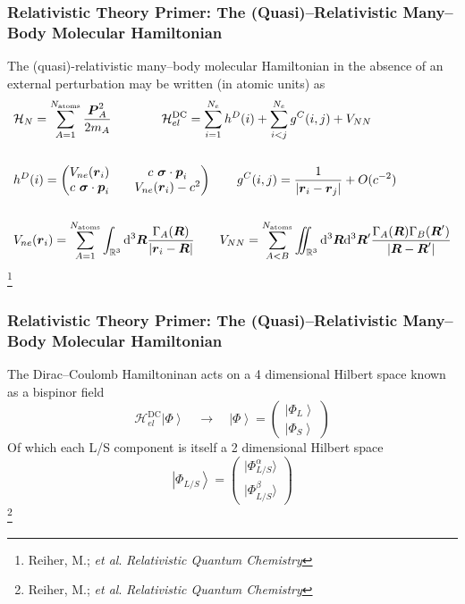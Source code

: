 \documentclass[usepdftitle=false,10pt]{beamer}
\newcommand{\ket}[1]{\left\vert #1 \right\rangle}         %
\newcommand*\vc[1]{\boldsymbol{#1}}
\newcommand*\op[1]{\mathcal{#1}}
\renewcommand*\iint[0]{\int\hspace{-8pt}\int}
\newcommand\blfootnote[1]{%
  \begingroup
  \renewcommand\thefootnote{}\footnote{#1}%
  \addtocounter{footnote}{-1}%
  \endgroup
}
\begin{document}
\begin{frame}
  \frametitle{Relativistic Theory Primer: The (Quasi)--Relativistic Many--Body 
  Molecular Hamiltonian}

  The (quasi)-relativistic many--body molecular Hamiltonian in the absence of 
  an external perturbation may be written (in atomic units) as
  \begin{align*}
    &\op{H}_N = \sum_{A=1}^{N_\mathrm{atoms}} \frac{\vc{P}^2_A}{2m_A} \qquad\qquad
     \op{H}^\mathrm{DC}_{el} = 
       \sum_{i=1}^{N_e} h^D(i) + \sum_{i < j}^{N_e} g^C(i,j) + V_{NN} \\
    \\
    & h^D(i) = 
      \begin{pmatrix}
        V_{ne}(\vc{r}_i) && c\text{ }\vc{\sigma} \cdot \vc{p}_i\\
	c\text{ }\vc{\sigma} \cdot \vc{p}_i && V_{ne}(\vc{r}_i) - c^2
      \end{pmatrix} \qquad 
      g^C(i,j) = \frac{1}{\vert \vc{r}_i - \vc{r}_j\vert} + O(c^{-2})
      \\ \\ 
    & V_{ne}(\vc{r}_i) = \sum_{A=1}^{N_\mathrm{atoms}}
                    \int_{\mathbb{R}^3}\mathrm{d}^3\vc{R}
		    \frac{\Gamma_A(\vc{R})}{\vert \vc{r}_i - \vc{R}\vert}
      \qquad V_{NN} = \sum_{A<B}^{N_\mathrm{atoms}}
                    \iint_{\mathbb{R}^3}\mathrm{d}^3\vc{R}\mathrm{d}^3\vc{R}'
		    \frac{\Gamma_A(\vc{R})\Gamma_B(\vc{R}')}
		         {\vert \vc{R} - \vc{R}'\vert}
  \end{align*}
  \blfootnote{\tiny Reiher, M.; \emph{et al}. \emph{Relativistic Quantum Chemistry}}
\end{frame}

\begin{frame}
  \frametitle{Relativistic Theory Primer: The (Quasi)--Relativistic Many--Body 
  Molecular Hamiltonian}

  The Dirac--Coulomb Hamiltoninan acts on a 4 dimensional Hilbert space
  known as a bispinor field
  \begin{equation*}
    \op{H}_{el}^\mathrm{DC} \ket{\Phi} \quad \rightarrow \quad 
    \ket{\Phi} = \begin{pmatrix} \ket{\Phi_L} \\ \ket{\Phi_S} \end{pmatrix}
  \end{equation*}
  Of which each L/S component is itself a 2 dimensional Hilbert space
  \begin{equation*}
    \ket{\Phi_{L/S}} =
      \begin{pmatrix} \vert\Phi_{L/S}^\alpha\rangle \\ \vert\Phi_{L/S}^\beta\rangle
      \end{pmatrix}
  \end{equation*}
  \blfootnote{\tiny Reiher, M.; \emph{et al}. \emph{Relativistic Quantum Chemistry}}

\end{frame}
\end{document}
